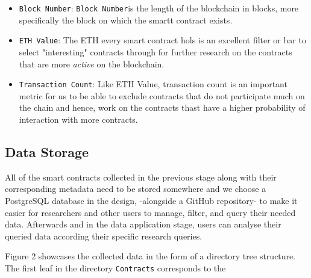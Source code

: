 \begin{itemize}
		\item{\verb|Block Number|: \verb|Block Number|is the length of the blockchain in blocks, more specifically the block on which the smartt contract exists.}\\
		\item \verb|ETH Value|: The ETH every smart contract hols is an excellent filter or bar to select "interesting" contracts through for further research on the contracts that are more \emph{active} on the blockchain.\\

		\item \verb|Transaction Count|: Like ETH Value, transaction count is an important metric for us to be able to exclude contracts that do not participate much on the chain and hence, work on the contracts thast have a higher probability of interaction with more contracts.\\
		\end{itemize}
	
	\subsection{Data Storage}
			All of the smart contracts collected in the previous stage along with their corresponding metadata need to be stored somewhere and we choose a PostgreSQL database in the design, -alongside a GitHub repository- to make it easier for researchers and other users to manage, filter, and query their needed data.
			Afterwards and in the data application stage, users can analyse their queried data according their specific research queries.

			Figure 2 showcases the collected data in the form of a directory tree structure.
			The first leaf in the directory \texttt{Contracts} corresponds to the \\



